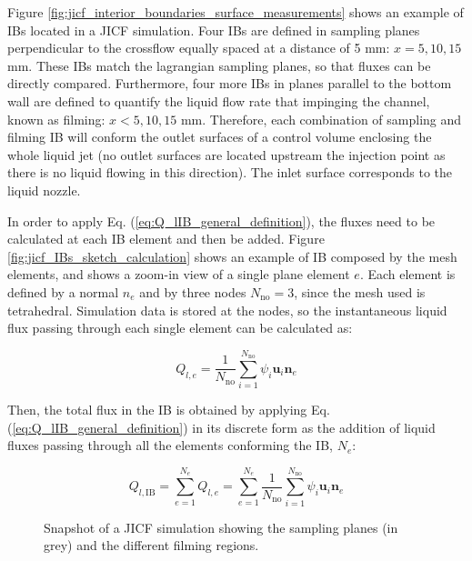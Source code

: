 Figure \ref{fig:jicf_interior_boundaries_surface_measurements} shows an example of IBs located in a JICF simulation. Four IBs are defined in sampling planes perpendicular to the crossflow equally spaced at a distance of 5 mm: $x = 5, 10, 15$ mm. These IBs match the lagrangian sampling planes, so that fluxes can be directly compared. Furthermore, four more IBs in planes parallel to the bottom wall are defined to quantify the liquid flow rate that impinging the channel, known as filming: $x <5, 10, 15$ mm. Therefore, each combination of sampling and filming IB will conform the outlet surfaces of a control volume enclosing the whole liquid jet (no outlet surfaces are located upstream the injection point as there is no liquid flowing in this direction). The inlet surface corresponds to the liquid nozzle.



In order to apply Eq. (\ref{eq:Q_lIB_general_definition}), the fluxes need to be calculated at each IB element and then be added. Figure \ref{fig:jicf_IBs_sketch_calculation} shows an example of IB composed by the mesh elements, and shows a zoom-in view of a single plane element $e$. Each element is defined by a normal $n_e$ and by three nodes $N_\mathrm{no} = 3$, since the mesh used is tetrahedral. Simulation data is stored at the nodes, so the instantaneous liquid flux passing through each single element can be calculated as:

\begin{equation}
Q_{l,e} = \frac{1}{N_\mathrm{no}} \sum_{i=1}^{N_\mathrm{no}} \psi_i \textbf{u}_i \textbf{n}_e
\end{equation}

Then, the total flux in the IB is obtained by applying Eq. (\ref{eq:Q_lIB_general_definition}) in its discrete form as the addition of liquid fluxes passing through all the elements conforming the IB, $N_e$:

\begin{equation}
\label{eq:Q_lIB_definition_with_Ne_and_No}
Q_{l,\mathrm{IB}} = \sum_{e=1}^{N_e} Q_{l,e} = \sum_{e=1}^{N_e} \frac{1}{N_\mathrm{no}} \sum_{i=1}^{N_\mathrm{no}} \psi_i \textbf{u}_i \textbf{n}_e
\end{equation}

\begin{figure}[ht]
     \centering
     \caption{Snapshot of a JICF simulation showing the sampling planes (in grey) and the different filming regions.}
      \label{fig:XXjicf_interior_boundaries_surface_measurements}
\end{figure}

